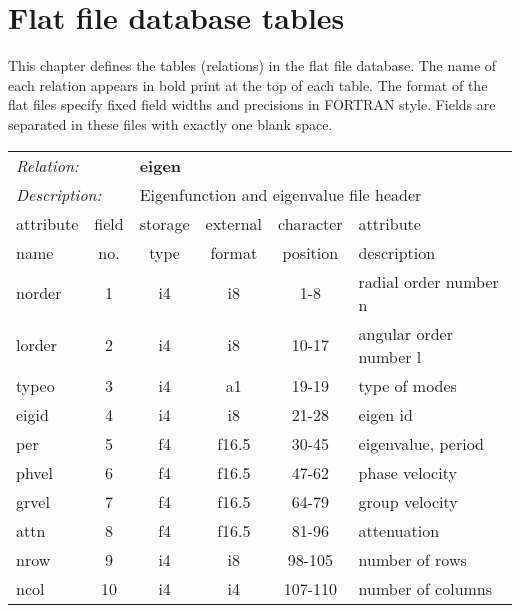 \section {Flat file database tables}

This chapter defines the tables (relations) in the flat file database. 
The name of each relation appears in bold print at the top of each table. 
The format of the flat files specify fixed field
widths and precisions in FORTRAN style. Fields are separated
in these files with exactly one blank space.


\begin{center}
\begin{tabular*}{1.0\textwidth}{@{\extracolsep{\fill}}|lccccl|}  \hline
\multicolumn{2}{|l}{{\it Relation:}} & \multicolumn{4}{l|}{{\bf eigen}} \\
\multicolumn{2}{|l}{{\it Description:}} & \multicolumn{4}{l|}{Eigenfunction and eigenvalue file header} \\ \cline{1-6}
\multicolumn{1}{|l}{attribute \vspace{-0.07 in}} & \multicolumn{1}{c}{field} & \multicolumn{1}{c}{storage} & \multicolumn{1}{c}{external} & \multicolumn{1}{c}{character} & \multicolumn{1}{l|}{attribute} \\
\multicolumn{1}{|l}{name} &  \multicolumn{1}{c}{no.} & \multicolumn{1}{c}{type} & \multicolumn{1}{c}{format} & \multicolumn{1}{c}{position} & \multicolumn{1}{l|}{description} \\ \hline\hline
norder  & 1  &   i4   &  i8    &   1-8    & radial order number n \\
lorder  & 2  &   i4   &  i8    &   10-17  & angular order number l \\
typeo   & 3  &   i4   &  a1    &   19-19  & type of modes \\
eigid   & 4  &   i4   &  i8    &   21-28  & eigen id \\
per     & 5  &   f4   &  f16.5 &   30-45  & eigenvalue, period   \\
phvel   & 6  &   f4   &  f16.5 &   47-62  & phase velocity \\
grvel   & 7  &   f4   &  f16.5 &   64-79  & group velocity \\
attn    & 8  &   f4   &  f16.5 &   81-96  & attenuation \\
nrow    & 9  &   i4   &  i8    &   98-105 & number of rows \\
ncol    &10  &   i4   &  i4    &  107-110 & number of columns \\

\end{tabular*}
\end{center}
